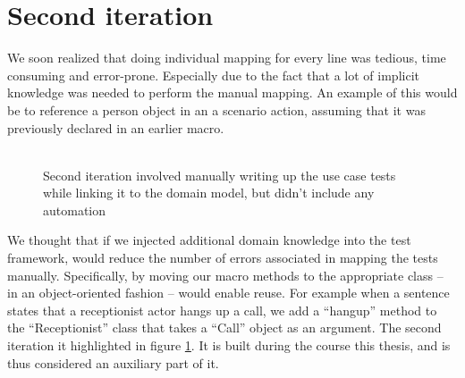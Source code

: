 \section{Second iteration}
We soon realized that doing individual mapping for every line was tedious, time consuming and error-prone. Especially due to the fact that a lot of implicit knowledge was needed to perform the manual mapping. An example of this would be to reference a person object in an a scenario action, assuming that it was previously declared in an earlier macro.\\\\
\begin{figure}[!htbp]
\centering
{}
\caption{Second iteration involved manually writing up the use case tests while linking it to the domain model, but didn't include any automation}
\label{fig:project_parameter_plot_2nd_iteration}
\end{figure}We thought that if we injected additional domain knowledge into the test framework, would reduce the number of errors associated in mapping the tests manually. Specifically, by moving our macro methods to the appropriate class -- in an object-oriented fashion -- would enable reuse. For example when a sentence states that a receptionist actor hangs up a call, we add a ``hangup'' method to the  ``Receptionist'' class that takes a ``Call'' object as an argument. The second iteration it highlighted in figure \ref{fig:project_parameter_plot_2nd_iteration}. It is built during the course this thesis, and is thus considered an auxiliary part of it.

